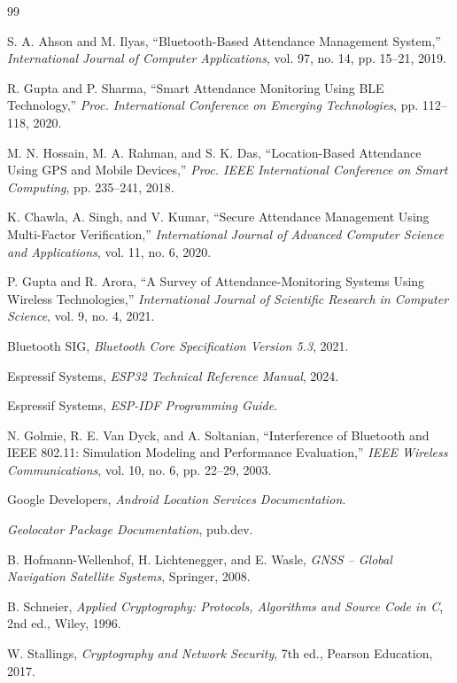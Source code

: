 \documentclass[12pt, a4paper, oneside]{report}
\begin{document}
\begin{thebibliography}{99}

 S. A. Ahson and M. Ilyas, ``Bluetooth-Based Attendance Management System,'' \textit{International Journal of Computer Applications}, vol. 97, no. 14, pp. 15--21, 2019.

 R. Gupta and P. Sharma, ``Smart Attendance Monitoring Using BLE Technology,'' \textit{Proc. International Conference on Emerging Technologies}, pp. 112--118, 2020.

 M. N. Hossain, M. A. Rahman, and S. K. Das, ``Location-Based Attendance Using GPS and Mobile Devices,'' \textit{Proc. IEEE International Conference on Smart Computing}, pp. 235--241, 2018.

 K. Chawla, A. Singh, and V. Kumar, ``Secure Attendance Management Using Multi-Factor Verification,'' \textit{International Journal of Advanced Computer Science and Applications}, vol. 11, no. 6, 2020.

 P. Gupta and R. Arora, ``A Survey of Attendance-Monitoring Systems Using Wireless Technologies,'' \textit{International Journal of Scientific Research in Computer Science}, vol. 9, no. 4, 2021.

 Bluetooth SIG, \textit{Bluetooth Core Specification Version 5.3}, 2021.

 Espressif Systems, \textit{ESP32 Technical Reference Manual}, 2024.

 Espressif Systems, \textit{ESP-IDF Programming Guide}.

 N. Golmie, R. E. Van Dyck, and A. Soltanian, ``Interference of Bluetooth and IEEE 802.11: Simulation Modeling and Performance Evaluation,'' \textit{IEEE Wireless Communications}, vol. 10, no. 6, pp. 22--29, 2003.

 Google Developers, \textit{Android Location Services Documentation}.

 \textit{Geolocator Package Documentation}, pub.dev.

 B. Hofmann-Wellenhof, H. Lichtenegger, and E. Wasle, \textit{GNSS -- Global Navigation Satellite Systems}, Springer, 2008.

 B. Schneier, \textit{Applied Cryptography: Protocols, Algorithms and Source Code in C}, 2nd ed., Wiley, 1996.

 W. Stallings, \textit{Cryptography and Network Security}, 7th ed., Pearson Education, 2017.


\end{thebibliography}
\end{document}
